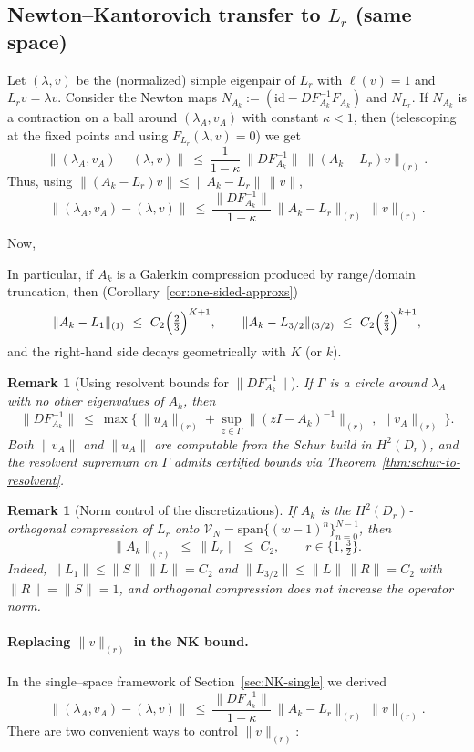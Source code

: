 \documentclass[11pt]{article}
\newtheorem{remark}[definition]{Remark}
\begin{document}
\subsection*{Newton--Kantorovich transfer to $L_r$ (same space)}
Let \((\lambda,v)\) be the (normalized) simple eigenpair of \(L_r\) with
\(\ell(v)=1\) and \(L_r v=\lambda v\). Consider the Newton maps
\(N_{A_k}:=(\mathrm{id}-DF_{A_k}^{-1}F_{A_k})\) and \(N_{L_r}\).
If \(N_{A_k}\) is a contraction on a ball around \((\lambda_A,v_A)\) with constant \(\kappa<1\),
then (telescoping at the fixed points and using \(F_{L_r}(\lambda,v)=0\)) we get
\[
\big\|(\lambda_A,v_A)-(\lambda,v)\big\|
\ \le\ \frac{1}{1-\kappa}\ \|DF_{A_k}^{-1}\|\ \|(A_k-L_r)v\|_{(r)}.
\]
Thus, using \(\|(A_k-L_r)v\|\le \|A_k-L_r\|\,\|v\|\),
\[
\boxed{\quad
\big\|(\lambda_A,v_A)-(\lambda,v)\big\|
\ \le\ \frac{\|DF_{A_k}^{-1}\|}{1-\kappa}\ \|A_k-L_r\|_{(r)}\ \|v\|_{(r)}.
\quad}
\]

Now, 

In particular, if \(A_k\) is a Galerkin compression produced by range/domain truncation,
then (Corollary~\ref{cor:one-sided-approxs})
\[
\|A_k-L_1\|_{(1)}\ \le\ C_2\Bigl(\tfrac{2}{3}\Bigr)^{K+1},
\qquad
\|A_k-L_{3/2}\|_{(3/2)}\ \le\ C_2\Bigl(\tfrac{2}{3}\Bigr)^{k+1},
\]
and the right-hand side decays geometrically with \(K\) (or \(k\)).

\begin{remark}[Using resolvent bounds for \(\|DF_{A_k}^{-1}\|\)]
If \(\Gamma\) is a circle around \(\lambda_A\) with no other eigenvalues of \(A_k\), then
\[
\|DF_{A_k}^{-1}\|
\ \le\ \max\Big\{\ \|u_A\|_{(r)} + \sup_{z\in\Gamma}\|(zI-A_k)^{-1}\|_{(r)}\ ,\ \|v_A\|_{(r)}\ \Big\}.
\]
Both \(\|v_A\|\) and \(\|u_A\|\) are computable from the Schur build in \(H^2(D_r)\),
and the resolvent supremum on \(\Gamma\) admits certified bounds via
Theorem~\ref{thm:schur-to-resolvent}.
\end{remark}

\begin{remark}[Norm control of the discretizations]\label{rem:Ak-norms}
If \(A_k\) is the \(H^2(D_r)\)-orthogonal compression of \(L_r\) onto
\(\mathcal V_N=\mathrm{span}\{(w-1)^n\}_{n=0}^{N-1}\), then
\[
\|A_k\|_{(r)}\ \le\ \|L_r\|\ \le\ C_2,\qquad r\in\{1,\tfrac32\}.
\]
Indeed, \(\|L_1\|\le \|S\|\,\|L\|=C_2\) and \(\|L_{3/2}\|\le \|L\|\,\|R\|=C_2\)
with \(\|R\|=\|S\|=1\), and orthogonal compression does not increase the operator norm.
\end{remark}

\paragraph{Replacing $\|v\|_{(r)}$ in the NK bound.}
In the single–space framework of Section~\ref{sec:NK-single} we derived
\[
\big\|(\lambda_A,v_A)-(\lambda,v)\big\|
\ \le\ \frac{\|DF_{A_k}^{-1}\|}{1-\kappa}\ \|A_k-L_r\|_{(r)}\ \|v\|_{(r)}.
\tag{$\ast$}
\]
There are two convenient ways to control $\|v\|_{(r)}$:
\end{document}
